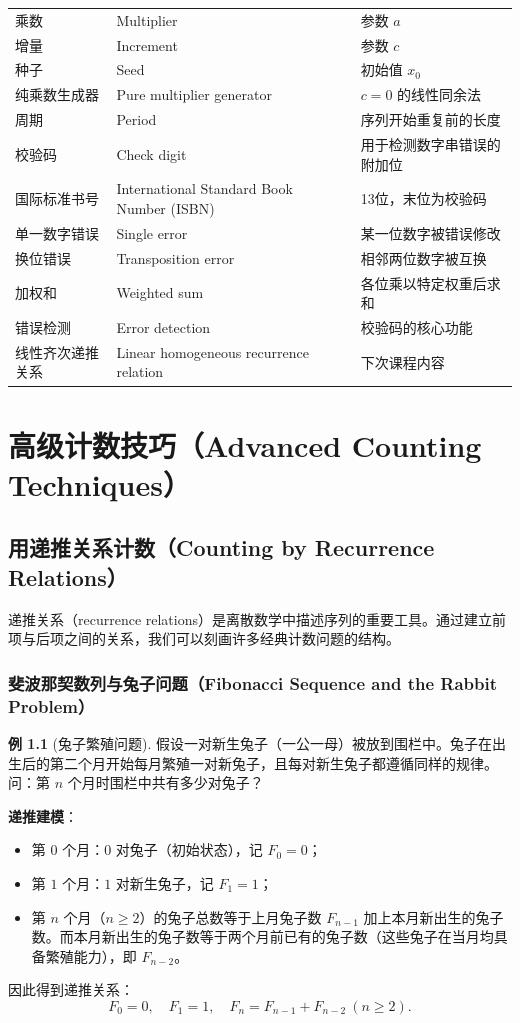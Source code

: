 \documentclass[UTF8,11pt,a4paper]{ctexbook}   %
\theoremstyle{definition}
\newtheorem{example}{例}[section]
\begin{document}
\begin{longtable}{|p{4.8cm}|p{4.8cm}|p{4.8cm}|}
乘数 & Multiplier & 参数 $a$ \\
增量 & Increment & 参数 $c$ \\
种子 & Seed & 初始值 $x_0$ \\
纯乘数生成器 & Pure multiplier generator & $c=0$ 的线性同余法 \\
周期 & Period & 序列开始重复前的长度 \\
校验码 & Check digit & 用于检测数字串错误的附加位 \\
国际标准书号 & International Standard Book Number (ISBN) & 13位，末位为校验码 \\
单一数字错误 & Single error & 某一位数字被错误修改 \\
换位错误 & Transposition error & 相邻两位数字被互换 \\
加权和 & Weighted sum & 各位乘以特定权重后求和 \\
错误检测 & Error detection & 校验码的核心功能 \\
线性齐次递推关系 & Linear homogeneous recurrence relation & 下次课程内容 \\
\hline
\end{longtable}

\newpage
\chapter{高级计数技巧（Advanced Counting Techniques）}

\section{用递推关系计数（Counting by Recurrence Relations）}

递推关系（recurrence relations）是离散数学中描述序列的重要工具。通过建立前项与后项之间的关系，我们可以刻画许多经典计数问题的结构。

\subsection{斐波那契数列与兔子问题（Fibonacci Sequence and the Rabbit Problem）}

\begin{example}[兔子繁殖问题]
假设一对新生兔子（一公一母）被放到围栏中。兔子在出生后的第二个月开始每月繁殖一对新兔子，且每对新生兔子都遵循同样的规律。问：第 $n$ 个月时围栏中共有多少对兔子？

\textbf{递推建模}：
\begin{itemize}
    \item 第 $0$ 个月：$0$ 对兔子（初始状态），记 $F_0 = 0$；
    \item 第 $1$ 个月：$1$ 对新生兔子，记 $F_1 = 1$；
    \item 第 $n$ 个月（$n \ge 2$）的兔子总数等于上月兔子数 $F_{n-1}$ 加上本月新出生的兔子数。而本月新出生的兔子数等于两个月前已有的兔子数（这些兔子在当月均具备繁殖能力），即 $F_{n-2}$。
\end{itemize}

因此得到递推关系：
\[
F_0 = 0,\quad F_1 = 1,\quad F_n = F_{n-1} + F_{n-2}\ (n \ge 2).
\]
\end{example}
\end{document}
